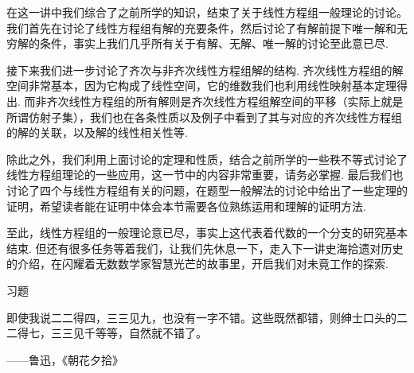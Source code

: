 在这一讲中我们综合了之前所学的知识，结束了关于线性方程组一般理论的讨论。我们首先在讨论了线性方程组有解的充要条件，然后讨论了有解前提下唯一解和无穷解的条件，事实上我们几乎所有关于有解、无解、唯一解的讨论至此意已尽.

接下来我们进一步讨论了齐次与非齐次线性方程组解的结构. 齐次线性方程组的解空间非常基本，因为它构成了线性空间，它的维数我们也利用线性映射基本定理得出. 而非齐次线性方程组的所有解则是齐次线性方程组解空间的平移（实际上就是所谓仿射子集），我们也在各条性质以及例子中看到了其与对应的齐次线性方程组的解的关联，以及解的线性相关性等.

除此之外，我们利用上面讨论的定理和性质，结合之前所学的一些秩不等式讨论了线性方程组理论的一些应用，这一节中的内容非常重要，请务必掌握. 最后我们也讨论了四个与线性方程组有关的问题，在题型一般解法的讨论中给出了一些定理的证明，希望读者能在证明中体会本节需要各位熟练运用和理解的证明方法.

至此，线性方程组的一般理论意已尽，事实上这代表着代数的一个分支的研究基本结束. 但还有很多任务等着我们，让我们先休息一下，走入下一讲史海拾遗对历史的介绍，在闪耀着无数数学家智慧光芒的故事里，开启我们对未竟工作的探索.

\vspace{2ex}
\centerline{\heiti \Large 习题}

\vspace{2ex}
{\kaishu 即使我说二二得四，三三见九，也没有一字不错。这些既然都错，则绅士口头的二二得七，三三见千等等，自然就不错了。}
\begin{flushright}
    \kaishu
    ——鲁迅，《朝花夕拾》
\end{flushright}

